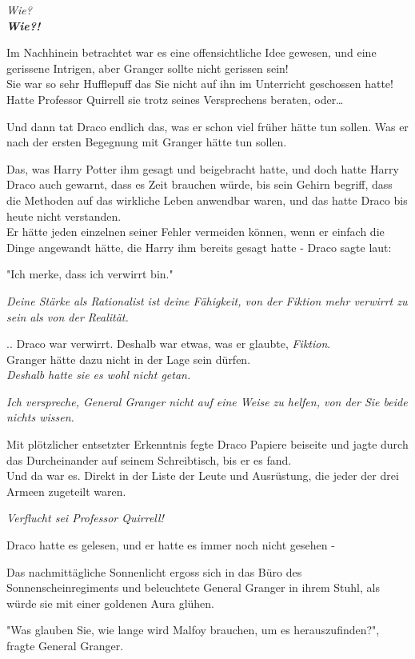 {\emph{Wie?}\\ \textbf{\emph{Wie?!}}

Im Nachhinein betrachtet war es eine offensichtliche Idee gewesen, und eine gerissene Intrigen, aber Granger sollte nicht gerissen sein!\\ Sie war so sehr Hufflepuff das Sie nicht auf ihn im Unterricht geschossen hatte! Hatte Professor Quirrell sie trotz seines Versprechens beraten, oder…

Und dann tat Draco endlich das, was er schon viel früher hätte tun sollen. Was er nach der ersten Begegnung mit Granger hätte tun sollen.

Das, was Harry Potter ihm gesagt und beigebracht hatte, und doch hatte Harry Draco auch gewarnt, dass es Zeit brauchen würde, bis sein Gehirn begriff, dass die Methoden auf das wirkliche Leben anwendbar waren, und das hatte Draco bis heute nicht verstanden.\\ Er hätte jeden einzelnen seiner Fehler vermeiden können, wenn er einfach die Dinge angewandt hätte, die Harry ihm bereits gesagt hatte - Draco sagte laut:

"Ich merke, dass ich verwirrt bin."

\emph{Deine Stärke als Rationalist ist deine Fähigkeit, von der Fiktion mehr verwirrt zu sein als von der Realität.}

.. Draco war verwirrt. Deshalb war etwas, was er glaubte, \emph{Fiktion}.\\ Granger hätte dazu nicht in der Lage sein dürfen.\\ \emph{Deshalb hatte sie es wohl nicht getan.}

\emph{Ich verspreche, General Granger nicht auf eine Weise zu helfen, von der Sie beide nichts wissen.}

Mit plötzlicher entsetzter Erkenntnis fegte Draco Papiere beiseite und jagte durch das Durcheinander auf seinem Schreibtisch, bis er es fand.\\ Und da war es. Direkt in der Liste der Leute und Ausrüstung, die jeder der drei Armeen zugeteilt waren.

\emph{Verflucht sei Professor Quirrell!}

Draco hatte es gelesen, und er hatte es immer noch nicht gesehen -

Das nachmittägliche Sonnenlicht ergoss sich in das Büro des Sonnenscheinregiments und beleuchtete General Granger in ihrem Stuhl, als würde sie mit einer goldenen Aura glühen.

"Was glauben Sie, wie lange wird Malfoy brauchen, um es herauszufinden?", fragte General Granger.

}
